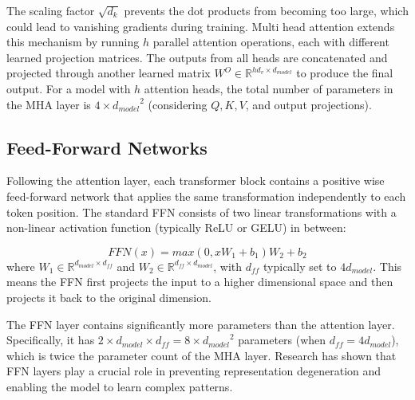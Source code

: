 \documentclass[conference]{IEEEtran}
\begin{document}
The scaling factor $\sqrt{d_k}$ prevents the dot products from becoming too large, which could lead to vanishing gradients during
training. Multi head attention extends this mechanism by running $h$ parallel attention operations, each with different learned projection
matrices. The outputs from all heads are concatenated and projected through another learned matrix
$W^O \in \mathbb{R}^{hd_v \times d_{model}}$ to produce the final output. For a model with $h$ attention heads, the total number
of parameters in the MHA layer is $4 \times {d_{model}}^2$ (considering $Q, K, V$, and output projections).

\subsection{Feed-Forward Networks}
Following the attention layer, each transformer block contains a positive wise feed-forward network that applies the same transformation
independently to each token position. The standard FFN consists of two linear transformations with a non-linear activation function
(typically ReLU or GELU) in between:

\[
FFN(x) = max(0, xW_1 + b_1)W_2 + b_2
\]
where $W_1 \in \mathbb{R}^{d_{model} \times d_{ff}}$ and $W_2 \in \mathbb{R}^{d_{ff} \times d_{model}}$, with $d_{ff}$ typically set
to $4d_{model}$. This means the FFN first projects the input to a higher dimensional space and then projects it back to the original
dimension.

The FFN layer contains significantly more parameters than the attention layer. Specifically, it has
$2 \times d_{model} \times d_{ff} = 8 \times {d_{model}}^2$ parameters (when $d_{ff} = 4d_{model}$), which is twice the parameter
count of the MHA layer. Research has shown that FFN layers play a crucial role in preventing representation degeneration and enabling
the model to learn complex patterns.

\end{document}
